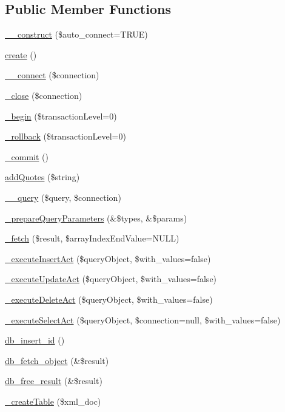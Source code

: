 \subsection*{Public Member Functions}
\begin{DoxyCompactItemize}
\item 
\hyperlink{classDBMysqli__innodb_a4820e34e4e36d0a935f3b65d04ca7b3b}{\-\_\-\-\_\-construct} (\$auto\-\_\-connect=T\-R\-U\-E)
\item 
\hyperlink{classDBMysqli__innodb_a70756f753a255650d67931f06d675608}{create} ()
\item 
\hyperlink{classDBMysqli__innodb_ab6db4cf73da0e11ed0045a07d751e334}{\-\_\-\-\_\-connect} (\$connection)
\item 
\hyperlink{classDBMysqli__innodb_a566f80a95a8b1e84155feb0868a90c84}{\-\_\-close} (\$connection)
\item 
\hyperlink{classDBMysqli__innodb_aeb782ffae3a856c9b5b5d61e569c84f1}{\-\_\-begin} (\$transaction\-Level=0)
\item 
\hyperlink{classDBMysqli__innodb_a1d9fceb6fa47fd0dce5e2ca05635aafc}{\-\_\-rollback} (\$transaction\-Level=0)
\item 
\hyperlink{classDBMysqli__innodb_a0ec5faa054822bd226fa6c404b17e674}{\-\_\-commit} ()
\item 
\hyperlink{classDBMysqli__innodb_aaf7572b62d23465db5d7bba8930004fc}{add\-Quotes} (\$string)
\item 
\hyperlink{classDBMysqli__innodb_a02098642ca57c84b9061172e8a3b8d17}{\-\_\-\-\_\-query} (\$query, \$connection)
\item 
\hyperlink{classDBMysqli__innodb_a0955069ad72c16d2652573e5883f037d}{\-\_\-prepare\-Query\-Parameters} (\&\$types, \&\$params)
\item 
\hyperlink{classDBMysqli__innodb_ae3c56ef21f1ba07dfd602534544e6fc9}{\-\_\-fetch} (\$result, \$array\-Index\-End\-Value=N\-U\-L\-L)
\item 
\hyperlink{classDBMysqli__innodb_a7f76f4789d2a6b1614345c4c69071546}{\-\_\-execute\-Insert\-Act} (\$query\-Object, \$with\-\_\-values=false)
\item 
\hyperlink{classDBMysqli__innodb_ad45981920c2258e135292b1ffedaecfb}{\-\_\-execute\-Update\-Act} (\$query\-Object, \$with\-\_\-values=false)
\item 
\hyperlink{classDBMysqli__innodb_a3ba692ef0c7a7d89ba5c7deee0fdd601}{\-\_\-execute\-Delete\-Act} (\$query\-Object, \$with\-\_\-values=false)
\item 
\hyperlink{classDBMysqli__innodb_abae8c007e13d7811697dadb3f9ef3930}{\-\_\-execute\-Select\-Act} (\$query\-Object, \$connection=null, \$with\-\_\-values=false)
\item 
\hyperlink{classDBMysqli__innodb_aec47da41558bdf42e9d2fe31c2ce87f2}{db\-\_\-insert\-\_\-id} ()
\item 
\hyperlink{classDBMysqli__innodb_a676cdff9d50d9398c0c2e3f9d50e8c0a}{db\-\_\-fetch\-\_\-object} (\&\$result)
\item 
\hyperlink{classDBMysqli__innodb_a0eb1700db91867677a8f7fa9e2f25298}{db\-\_\-free\-\_\-result} (\&\$result)
\item 
\hyperlink{classDBMysqli__innodb_adea880ad43bc281fbdae806bd25d6cce}{\-\_\-create\-Table} (\$xml\-\_\-doc)
\end{DoxyCompactItemize}
